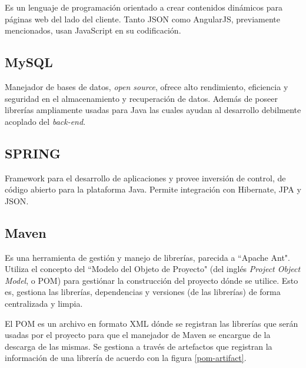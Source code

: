         Es un lenguaje de programación orientado a crear contenidos dinámicos para páginas web del lado del cliente. Tanto JSON como AngularJS, previamente mencionados, usan JavaScript en su codificación.
        
        \subsection{MySQL}
        \label{tecno-mysql}
        
        Manejador de bases de datos, \textit{open source}, ofrece alto rendimiento, eficiencia y seguridad en el almacenamiento y recuperación de datos\cite{MYSQL-oracle}. Además de poseer librerías ampliamente usadas para Java las cuales ayudan al desarrollo debilmente acoplado del \textit{back-end}.
        
        \subsection{SPRING}
        \label{tecno-spring}
        
        Framework para el desarrollo de aplicaciones y provee inversión de control, de código abierto para la plataforma Java. Permite integración con Hibernate, JPA y JSON\cite{SPRING-essential}.
        
        \subsection{Maven}
        \label{tecno-maven}
        
        Es una herramienta de gestión y manejo de librerías, parecida a ``Apache Ant". Utiliza el concepto del ``Modelo del Objeto de Proyecto" (del inglés \textit{Project Object Model}, o POM) para gestiónar la construcción del proyecto dónde se utilice. Esto es, gestiona las librerías, dependencias y versiones (de las librerías) de forma centralizada y limpia.
        
        El POM es un archivo en formato XML dónde se registran las librerías que serán usadas por el proyecto  para que el manejador de Maven se encargue de la descarga de las mismas. Se gestiona a través de artefactos que registran la información de una librería de acuerdo con la figura \ref{pom-artifact}.
        
